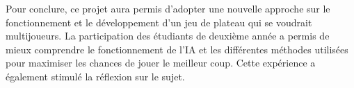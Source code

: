 \medbreak

Pour conclure, ce projet aura permis d'adopter une nouvelle approche sur le fonctionnement et le développement d'un jeu de plateau qui se voudrait multijoueurs. La participation des étudiants de deuxième année a permis de mieux comprendre le fonctionnement de l'IA et les différentes méthodes utilisées pour maximiser les chances de jouer le meilleur coup. Cette expérience a également stimulé la réflexion sur le sujet.
